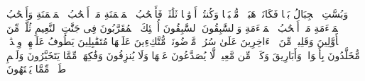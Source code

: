 وَبُسَّتِ ٱلۡجِبَالُ بَسࣰّا%
\stopbuffer
\startbuffer[\q:56:6]
فَكَانَتۡ هَبَاۤءࣰ مُّنۢبَثࣰّا%
\stopbuffer
\startbuffer[\q:56:7]
وَكُنتُمۡ أَزۡوَٰجࣰا ثَلَٰثَةࣰ%
\stopbuffer
\startbuffer[\q:56:8]
فَأَصۡحَٰبُ ٱلۡمَیۡمَنَةِ مَاۤ أَصۡحَٰبُ ٱلۡمَیۡمَنَةِ%
\stopbuffer
\startbuffer[\q:56:9]
وَأَصۡحَٰبُ ٱلۡمَشۡءَمَةِ مَاۤ أَصۡحَٰبُ ٱلۡمَشۡءَمَةِ%
\stopbuffer
\startbuffer[\q:56:10]
وَٱلسَّٰبِقُونَ ٱلسَّٰبِقُونَ%
\stopbuffer
\startbuffer[\q:56:11]
أُو۟لَٰۤئِكَ ٱلۡمُقَرَّبُونَ%
\stopbuffer
\startbuffer[\q:56:12]
فِی جَنَّٰتِ ٱلنَّعِیمِ%
\stopbuffer
\startbuffer[\q:56:13]
ثُلَّةࣱ مِّنَ ٱلۡأَوَّلِینَ%
\stopbuffer
\startbuffer[\q:56:14]
وَقَلِیلࣱ مِّنَ ٱلۡءَاخِرِینَ%
\stopbuffer
\startbuffer[\q:56:15]
عَلَىٰ سُرُرࣲ مَّوۡضُونَةࣲ%
\stopbuffer
\startbuffer[\q:56:16]
مُّتَّكِءِینَ عَلَیۡهَا مُتَقَٰبِلِینَ%
\stopbuffer
\startbuffer[\q:56:17]
یَطُوفُ عَلَیۡهِمۡ وِلۡدَٰنࣱ مُّخَلَّدُونَ%
\stopbuffer
\startbuffer[\q:56:18]
بِأَكۡوَابࣲ وَأَبَارِیقَ وَكَأۡسࣲ مِّن مَّعِینࣲ%
\stopbuffer
\startbuffer[\q:56:19]
لَّا یُصَدَّعُونَ عَنۡهَا وَلَا یُنزِفُونَ%
\stopbuffer
\startbuffer[\q:56:20]
وَفَٰكِهَةࣲ مِّمَّا یَتَخَیَّرُونَ%
\stopbuffer
\startbuffer[\q:56:21]
وَلَحۡمِ طَیۡرࣲ مِّمَّا یَشۡتَهُونَ%
\stopbuffer
